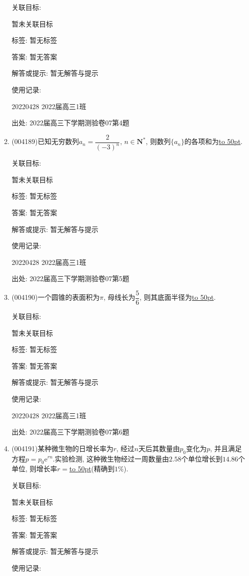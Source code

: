 \documentclass[10pt,a4paper]{article}
\newcommand{\blank}[1]{\underline{\hbox to #1pt{}}}
\begin{document}
\begin{enumerate}[1.]
关联目标:

暂未关联目标



标签: 暂无标签

答案: 暂无答案

解答或提示: 暂无解答与提示

使用记录:

20220428	2022届高三1班	


出处: 2022届高三下学期测验卷07第4题
\item { (004189)}已知无穷数列$a_n=\dfrac 2{(-3)^n}$, $n\in \mathbf{N}^*$, 则数列$\{a_n\}$的各项和为\blank{50}.


关联目标:

暂未关联目标



标签: 暂无标签

答案: 暂无答案

解答或提示: 暂无解答与提示

使用记录:

20220428	2022届高三1班	


出处: 2022届高三下学期测验卷07第5题
\item { (004190)}一个圆锥的表面积为$\pi$, 母线长为$\dfrac 56$, 则其底面半径为\blank{50}.


关联目标:

暂未关联目标



标签: 暂无标签

答案: 暂无答案

解答或提示: 暂无解答与提示

使用记录:

20220428	2022届高三1班	


出处: 2022届高三下学期测验卷07第6题
\item { (004191)}某种微生物的日增长率为$r$, 经过$n$天后其数量由$p_0$变化为$p$, 并且满足方程$p=p_0\mathrm{e}^{rn}$.实验检测, 这种微生物经过一周数量由$2.58$个单位增长到$14.86$个单位, 则增长率$r=$\blank{50}(精确到$1\%$).


关联目标:

暂未关联目标



标签: 暂无标签

答案: 暂无答案

解答或提示: 暂无解答与提示

使用记录:


\end{enumerate}
\end{document}
